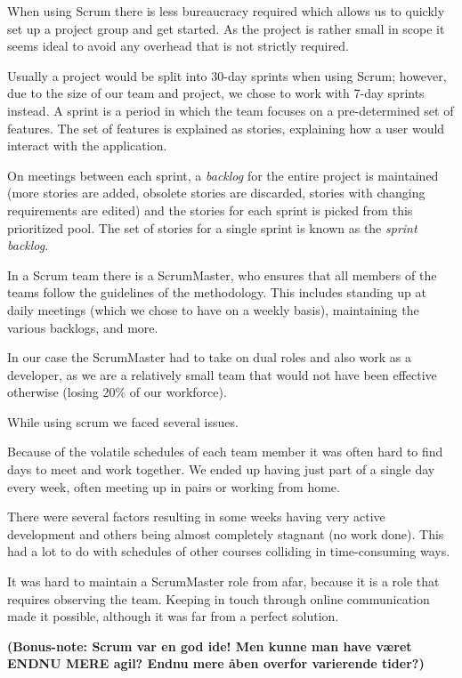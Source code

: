 When using Scrum there is less bureaucracy required\cite{caye} which allows us to quickly set up a project
group and get started. As the project is rather small in scope it seems ideal to avoid any overhead
that is not strictly required.

Usually a project would be split into 30-day sprints when using Scrum; however, due to the size of
our team and project, we chose to work with 7-day sprints instead. A sprint is a period in which the
team focuses on a pre-determined set of features. The set of features is explained as stories,
explaining how a user would interact with the application.

On meetings between each sprint, a \emph{backlog} for the entire project is maintained (more stories are
added, obsolete stories are discarded, stories with changing requirements are edited) and the stories
for each sprint is picked from this prioritized pool. The set of stories for a single sprint is known
as the \emph{sprint backlog}.

In a Scrum team there is a ScrumMaster, who ensures that all members of the teams follow the guidelines
of the methodology. This includes standing up at daily meetings (which we chose to have on a weekly basis),
maintaining the various backlogs, and more.

In our case the ScrumMaster had to take on dual roles and also work as a developer, as we are a relatively
small team that would not have been effective otherwise (losing 20\% of our workforce).

While using scrum we faced several issues.

Because of the volatile schedules of each team member it was often hard to find days to meet and work
together. We ended up having just part of a single day every week, often meeting up in pairs or working
from home.

There were several factors resulting in some weeks having very active development and others being almost
completely stagnant (no work done). This had a lot to do with schedules of other courses colliding in
time-consuming ways.

It was hard to maintain a ScrumMaster role from afar, because it is a role that requires observing the
team. Keeping in touch through online communication made it possible, although it was far from a perfect
solution.

\textbf{(Bonus-note: Scrum var en god ide! Men kunne man have været ENDNU MERE agil? Endnu mere åben overfor
varierende tider?)}
